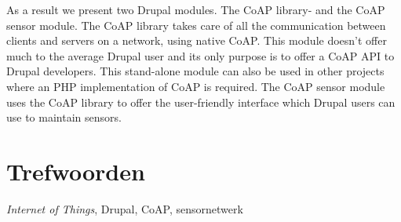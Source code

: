 {As a result we present two Drupal modules. The CoAP library- and the CoAP sensor module. The CoAP library takes care of all the communication between clients and servers on a network, using native CoAP. This module doesn't offer much to the average Drupal user and its only purpose is to offer a CoAP API to Drupal developers. This stand-alone module can also be used in other projects where an PHP implementation of CoAP is required. The CoAP sensor module uses the CoAP library to offer the user-friendly interface which Drupal users can use to maintain sensors.
\section*{Trefwoorden}


\textit{Internet of Things}, Drupal, CoAP, sensornetwerk

}

\newpage %
